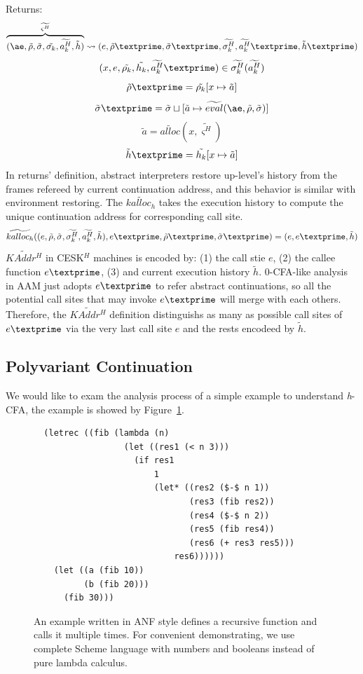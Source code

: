 \documentclass{article}
\begin{document}
Returns:
\[
\overbrace{
(\ae, \tilde{\rho}, \tilde{\sigma}, \tilde{\sigma_k}, \widetilde{a_k^H}, \tilde{h})
}^{\widetilde{\varsigma^H}}
\leadsto (e, \tilde{\rho}\textprime, \tilde{\sigma}\textprime, \widetilde{\sigma_k^H}, \widetilde{a_k^H}\textprime, \tilde{h}\textprime)
\]
\[
(x, e, \tilde{\rho_k}, \tilde{h_k}, \widetilde{a_k^H}\textprime) \in \widetilde{\sigma_k^H}(\widetilde{a_k^H})
\]
\[
\tilde{\rho}\textprime = \tilde{\rho_k}[x \mapsto \tilde{a}]
\]
\[
\tilde{\sigma}\textprime = \tilde{\sigma} \sqcup [\tilde{a} \mapsto \widetilde{eval}(\ae, \tilde{\rho}, \tilde{\sigma})]
\]
\[
\tilde{a} = \widetilde{alloc}(x, \widetilde{\varsigma^H})
\]
\[
\tilde{h}\textprime = \tilde{h_k}[x \mapsto \tilde{a}]
\]
In returns' definition, abstract interpreters restore up-level's history from the frames refereed by current continuation address, and this behavior is similar with environment restoring.
The $\widetilde{kalloc_h}$ takes the execution history to compute the unique continuation address for corresponding call site.
\[
\widetilde{kalloc_h} ((e, \tilde{\rho}, \tilde{\sigma}, \widetilde{\sigma_k^H}, \widetilde{a_k^H}, \tilde{h}), e\textprime, \tilde{\rho}\textprime, \tilde{\sigma}\textprime) =
(e, e\textprime, \tilde{h})
\]
$\widetilde{KAddr^H}$ in CESK$^H$ machines is encoded by: (1) the call stie $e$, (2) the callee function $e\textprime$, (3) and current execution history $\tilde{h}$. 0-CFA-like analysis in AAM just adopts $e\textprime$ to refer abstract continuations, so all the potential call sites that may invoke $e\textprime$ will merge with each others. Therefore, the $\widetilde{KAddr^H}$ definition distinguishs as many as possible call sites of $e\textprime$ via the very last call site $e$ and the rests encodeed by $\tilde{h}$.

\subsection{Polyvariant Continuation}
\label{sub:Polyvariant Continuation}
We would like to exam the analysis process of a simple example to understand \textit{h}-CFA, the example is showed by Figure~\ref{fig:anf-fib}.

\begin{figure}
\small
{}
\begin{lstlisting}
  (letrec ((fib (lambda (n)
                  (let ((res1 (< n 3)))
                    (if res1
                        1
                        (let* ((res2 ($-$ n 1))
                               (res3 (fib res2))
                               (res4 ($-$ n 2))
                               (res5 (fib res4))
                               (res6 (+ res3 res5)))
                            res6))))))
    (let ((a (fib 10))
          (b (fib 20)))
      (fib 30)))
\end{lstlisting}
\caption{
An example written in ANF style defines a recursive function and calls it multiple times.
For convenient  demonstrating, we use complete Scheme language with numbers and booleans instead of pure lambda calculus.
}
\label{fig:anf-fib}
\end{figure}
\end{document}
